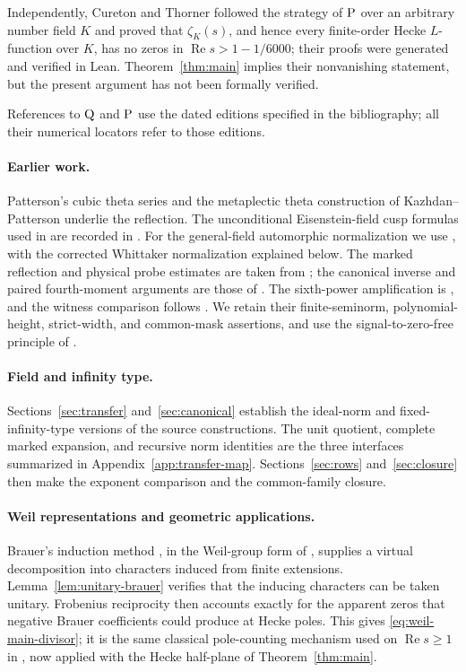 \documentclass[11pt,a4paper]{article}
\numberwithin{equation}{section}
\theoremstyle{definition}
\theoremstyle{remark}
\newcommand{\Rea}{\operatorname{Re}}
\newcommand{\Qsrc}{\textup{Q}}
\newcommand{\Psrc}{\textup{P}}
\begin{document}
Independently, Cureton and Thorner \cite{CT} followed the strategy of
$\Psrc$ over an arbitrary number field $K$ and proved that $\zeta_K(s)$,
and hence every finite-order Hecke $L$-function over $K$, has no zeros in
$\Rea s>1-1/6000$; their proofs were generated and verified in Lean.
Theorem~\ref{thm:main} implies their nonvanishing statement, but the
present argument has not been formally verified.

References to $\Qsrc$ and $\Psrc$ use the dated editions specified in the
bibliography; all their numerical locators refer to those editions.

\paragraph{Earlier work.}
Patterson's cubic theta series \cite{Patterson} and the metaplectic
theta construction of Kazhdan--Patterson \cite{KP,KPcorr} underlie
the reflection.  The unconditional Eisenstein-field cusp formulas used in
\cite[Section~5]{Q} are recorded in
\cite[Section~5.1 and Appendix~A]{DR}.  For the general-field
automorphic normalization we use \cite[Sections~3, 5--7 and Appendix~A]{P},
with the corrected Whittaker normalization explained below.
The marked reflection and physical probe estimates are taken from
\cite[Sections~5--16]{Q}; the canonical inverse and paired fourth-moment
arguments are those of \cite[Lemmas~17.1--17.2 and~18.1]{Q}.
The sixth-power amplification is \cite[Lemma~17.6]{Q}, and the witness
comparison follows \cite[Proposition~19.2]{Q}.
We retain their finite-seminorm, polynomial-height, strict-width,
and common-mask assertions, and use the signal-to-zero-free principle
of \cite[Proposition~2.1]{Q}.

\paragraph{Field and infinity type.}
Sections~\ref{sec:transfer} and~\ref{sec:canonical} establish the
ideal-norm and fixed-infinity-type versions of the source constructions.
The unit quotient, complete marked expansion, and recursive norm
identities are the three interfaces summarized in
Appendix~\ref{app:transfer-map}. Sections~\ref{sec:rows}
and~\ref{sec:closure} then make the exponent comparison and the
common-family closure.

\paragraph{Weil representations and geometric applications.}
Brauer's induction method \cite{Brauer}, in the Weil-group form of
\cite[Lemma~2.2]{Langlands}, supplies a virtual decomposition into
characters induced from finite extensions.  Lemma~\ref{lem:unitary-brauer}
verifies that the inducing characters can be taken unitary.  Frobenius
reciprocity then accounts exactly for the apparent zeros that negative
Brauer coefficients could produce at Hecke poles.  This gives
\eqref{eq:weil-main-divisor}; it is the same classical pole-counting
mechanism used on $\Rea s\geq1$ in
\cite[Proposition~11]{Johansson}, now applied with the Hecke half-plane
of Theorem~\ref{thm:main}.  
\end{document}
